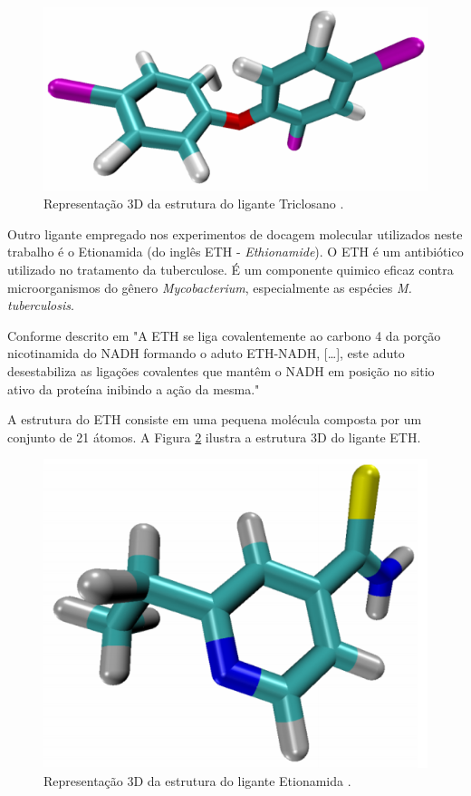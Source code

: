 \begin{figure}[h]
	\center
	\includegraphics[width=14cm]{images/tcl.png}
	\caption{Representação 3D da estrutura do ligante Triclosano \cite{kar11}.}
	\label{fig:tcl}
\end{figure}

Outro ligante empregado nos experimentos de docagem molecular utilizados neste trabalho é o Etionamida (do inglês ETH - \emph{Ethionamide}). O ETH é um antibiótico utilizado no tratamento da tuberculose. É um componente quimico eficaz contra microorganismos do gênero \emph{Mycobacterium}, especialmente as espécies \emph{M. tuberculosis}. 

Conforme descrito em \cite{COH10} "A ETH se liga covalentemente ao carbono 4 da porção nicotinamida do NADH formando o aduto ETH-NADH, […], este aduto desestabiliza as ligações covalentes que mantêm o NADH em posição no sitio ativo da proteína inibindo a ação da mesma."

A estrutura do ETH consiste em uma pequena molécula composta por um conjunto de 21 átomos. A Figura \ref{fig:eth} ilustra a estrutura 3D do ligante ETH.

\begin{figure}[h]
	\center
	\includegraphics[width=14cm]{images/eth.png}
	\caption{Representação 3D da estrutura do ligante Etionamida \cite{kar11}.}
	\label{fig:eth}
\end{figure}

